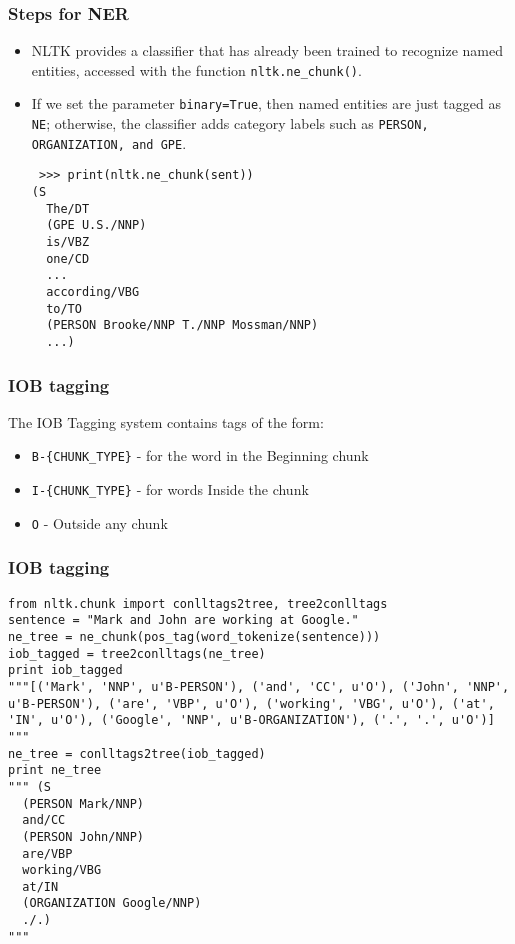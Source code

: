 \begin{frame}[fragile]\frametitle{Steps for NER}
  \begin{itemize}
  \item NLTK provides a classifier that has already been trained to recognize named entities, accessed with the function \lstinline|nltk.ne_chunk()|. 
\item If we set the parameter \lstinline|binary=True|, then named entities are just tagged as \lstinline|NE|; otherwise, the classifier adds category labels such as \lstinline|PERSON, ORGANIZATION, and GPE|.
  \begin{lstlisting}
 >>> print(nltk.ne_chunk(sent)) 
(S
  The/DT
  (GPE U.S./NNP)
  is/VBZ
  one/CD
  ...
  according/VBG
  to/TO
  (PERSON Brooke/NNP T./NNP Mossman/NNP)
  ...)
  \end{lstlisting}
  \end{itemize}
\end{frame}

\begin{frame}[fragile]\frametitle{IOB tagging}
The IOB Tagging system contains tags of the form:
  \begin{itemize}
  \item \lstinline|B-{CHUNK_TYPE}| - for the word in the Beginning chunk
  \item \lstinline|I-{CHUNK_TYPE}| - for words Inside the chunk
  \item \lstinline|O| - Outside any chunk
  \end{itemize}

\end{frame}

\begin{frame}[fragile]\frametitle{IOB tagging}
  \begin{lstlisting}
from nltk.chunk import conlltags2tree, tree2conlltags
sentence = "Mark and John are working at Google."
ne_tree = ne_chunk(pos_tag(word_tokenize(sentence)))
iob_tagged = tree2conlltags(ne_tree)
print iob_tagged
"""[('Mark', 'NNP', u'B-PERSON'), ('and', 'CC', u'O'), ('John', 'NNP', u'B-PERSON'), ('are', 'VBP', u'O'), ('working', 'VBG', u'O'), ('at', 'IN', u'O'), ('Google', 'NNP', u'B-ORGANIZATION'), ('.', '.', u'O')]
"""
ne_tree = conlltags2tree(iob_tagged)
print ne_tree
""" (S
  (PERSON Mark/NNP)
  and/CC
  (PERSON John/NNP)
  are/VBP
  working/VBG
  at/IN
  (ORGANIZATION Google/NNP)
  ./.)
"""
\end{lstlisting}
\end{frame}


